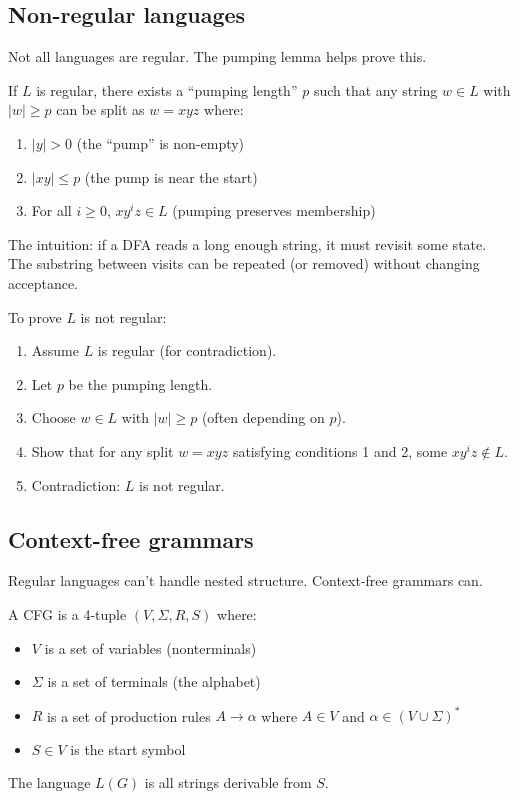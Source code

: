 \subsection*{Non-regular languages}

Not all languages are regular. The pumping lemma helps prove this.

\begin{theorem}
If $L$ is regular, there exists a ``pumping length'' $p$ such that any string $w \in L$ with $|w| \geq p$ can be split as $w = xyz$ where:
\begin{enumerate}
  \item $|y| > 0$ (the ``pump'' is non-empty)
  \item $|xy| \leq p$ (the pump is near the start)
  \item For all $i \geq 0$, $xy^iz \in L$ (pumping preserves membership)
\end{enumerate}
\end{theorem}

The intuition: if a DFA reads a long enough string, it must revisit some state. The substring between visits can be repeated (or removed) without changing acceptance.

\begin{strategy}
To prove $L$ is not regular:
\begin{enumerate}
  \item Assume $L$ is regular (for contradiction).
  \item Let $p$ be the pumping length.
  \item Choose $w \in L$ with $|w| \geq p$ (often depending on $p$).
  \item Show that for any split $w = xyz$ satisfying conditions 1 and 2, some $xy^iz \notin L$.
  \item Contradiction: $L$ is not regular.
\end{enumerate}
\end{strategy}

\subsection*{Context-free grammars}

Regular languages can't handle nested structure. Context-free grammars can.

\begin{definition}
A CFG is a 4-tuple $(V, \Sigma, R, S)$ where:
\begin{itemize}
  \item $V$ is a set of variables (nonterminals)
  \item $\Sigma$ is a set of terminals (the alphabet)
  \item $R$ is a set of production rules $A \to \alpha$ where $A \in V$ and $\alpha \in (V \cup \Sigma)^*$
  \item $S \in V$ is the start symbol
\end{itemize}
The language $L(G)$ is all strings derivable from $S$.
\end{definition}

